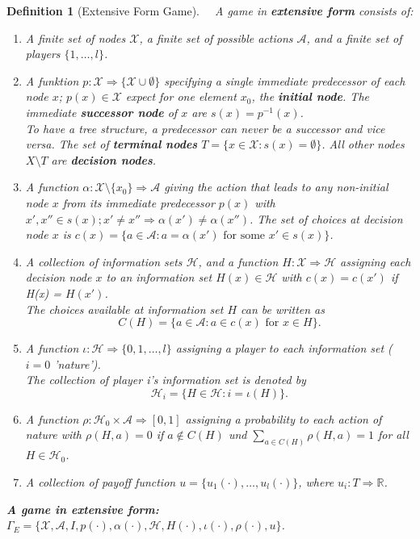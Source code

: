 \documentclass[12pt]{extreport} %
\newcommand{\R}{\mathbb{R}}
\theoremstyle{named}
\theoremstyle{itshape}
\newtheorem*{definition}{Definition}
\theoremstyle{normal}
\begin{document}
\begin{definition}[Extensive Form Game] ~\
	A game in \textbf{extensive form} consists of:
	\begin{enumerate}[label=(\roman*\upshape)]
		\item A finite set of nodes $\mathcal{X}$, a finite set of possible actions $\mathcal{A}$, and a finite set of players $\{1, \dotsc, l\}$.
		\item A funktion $p \colon \mathcal{X} \Rightarrow \{ \mathcal{X} \cup \emptyset \}$ specifying a single immediate predecessor of each node $x$; $p(x) \in \mathcal{X}$ expect for one element $x_{0}$, the \textbf{initial node}. The immediate \textbf{successor node} of $x$ are $s(x) = p^{-1}(x)$. ~\\
			To have a tree structure, a predecessor can never be a successor and vice versa. The set of \textbf{terminal nodes} $T = \{ x \in \mathcal{X} \colon s(x) = \emptyset \}$. All other nodes $X \setminus T$ are \textbf{decision nodes}.
		\item A function $\alpha \colon \mathcal{X} \setminus \{ x_{0} \} \Rightarrow \mathcal{A}$ giving the action that leads to any non-initial node $x$ from its immediate predecessor $p(x)$ with $x', x'' \in s(x); x' \neq x'' \Rightarrow \alpha(x') \neq \alpha(x'')$. The set of choices at decision node $x$ is $c(x) = \{ a \in \mathcal{A} \colon a = \alpha(x') \text{ for some } x' \in s(x) \}$.
		\item A collection of information sets $\mathcal{H}$, and a function $H \colon \mathcal{X} \Rightarrow \mathcal{H}$ assigning each decision node $x$ to an information set $H(x) \in \mathcal{H}$ with $c(x) = c(x')$ if H(x) = $H(x')$. ~\\
			The choices available at information set $H$ can be written as
			$$ C(H) = \{ a \in \mathcal{A} \colon a \in c(x) \text{ for } x \in H \}. $$
		\item A function $\iota \colon \mathcal{H} \Rightarrow \{ 0, 1, \dotsc, l \}$ assigning a player to each information set ($i = 0$ 'nature'). ~\\
			The collection of player i's information set is denoted by
			$$ \mathcal{H}_i = \{ H \in \mathcal{H} \colon i = \iota(H) \}. $$
		\item A function $\rho \colon \mathcal{H}_0 \times \mathcal{A} \Rightarrow [0,1]$ assigning a probability to each action of nature with $\rho(H,a) = 0$ if $a \notin C(H)$ und $\sum_{a \in C(H)} \rho(H, a) = 1$ for all $H \in \mathcal{H}_{0}$.
		\item A collection of payoff function $u = \{ u_1(\cdot), \dotsc, u_l(\cdot) \}$, where $u_i \colon T \Rightarrow \R$.
	\end{enumerate}
	\textbf{A game in extensive form:} $\Gamma_E = \{ \mathcal{X}, \mathcal{A}, I, p(\cdot), \alpha(\cdot), \mathcal{H}, H(\cdot), \iota(\cdot), \rho(\cdot), u \}$.
\end{definition}
\end{document}
